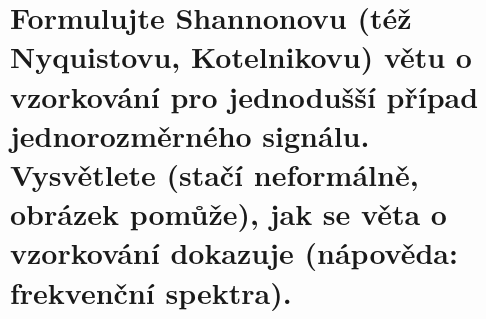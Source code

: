 \section{Formulujte Shannonovu (též Nyquistovu, Kotelnikovu) větu o vzorkování pro jednodušší případ jednorozměrného 
signálu. Vysvětlete (stačí neformálně, obrázek pomůže), jak se věta o vzorkování dokazuje (nápověda: frekvenční 
spektra).}